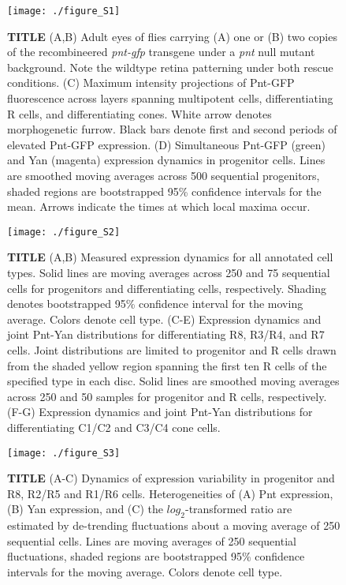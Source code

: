 \begin{figure}[h]
\centering
\texttt{[image: ./figure\_S1]}
\caption[TITLE]{\textbf{TITLE} (A,B) Adult eyes of flies carrying (A) one or (B) two copies of the recombineered \textit{pnt-gfp} transgene under a \textit{pnt} null mutant background. Note the wildtype retina patterning under both rescue conditions. (C) Maximum intensity projections of Pnt-GFP fluorescence across layers spanning multipotent cells, differentiating R cells, and differentiating cones. White arrow denotes morphogenetic furrow. Black bars denote first and second periods of elevated Pnt-GFP expression. (D) Simultaneous Pnt-GFP (green) and Yan (magenta) expression dynamics in progenitor cells. Lines are smoothed moving averages across 500 sequential progenitors, shaded regions are bootstrapped 95\% confidence intervals for the mean. Arrows indicate the times at which local maxima occur.}
\label{fig:ch2:figS1}
\end{figure}

\begin{figure}[h]
\centering
\texttt{[image: ./figure\_S2]}
\caption[TITLE]{\textbf{TITLE} (A,B) Measured expression dynamics for all annotated cell types. Solid lines are moving averages across 250 and 75 sequential cells for progenitors and differentiating cells, respectively. Shading denotes bootstrapped 95\% confidence interval for the moving average. Colors denote cell type. (C-E) Expression dynamics and joint Pnt-Yan distributions for differentiating R8, R3/R4, and R7 cells. Joint distributions are limited to progenitor and R cells drawn from the shaded yellow region spanning the first ten R cells of the specified type in each disc. Solid lines are smoothed moving averages across 250 and 50 samples for progenitor and R cells, respectively. (F-G) Expression dynamics and joint Pnt-Yan distributions for differentiating C1/C2 and C3/C4 cone cells.}
\label{fig:ch2:figS2}
\end{figure}

\begin{figure}[h]
\centering
\texttt{[image: ./figure\_S3]}
\caption[TITLE]{\textbf{TITLE} (A-C) Dynamics of expression variability in progenitor and R8, R2/R5 and R1/R6 cells. Heterogeneities of (A) Pnt expression, (B) Yan expression, and (C) the $log_2$-transformed ratio are estimated by de-trending fluctuations about a moving average of 250 sequential cells. Lines are moving averages of 250 sequential fluctuations, shaded regions are bootstrapped 95\% confidence intervals for the moving average. Colors denote cell type.}
\label{fig:ch2:figS3}
\end{figure}

